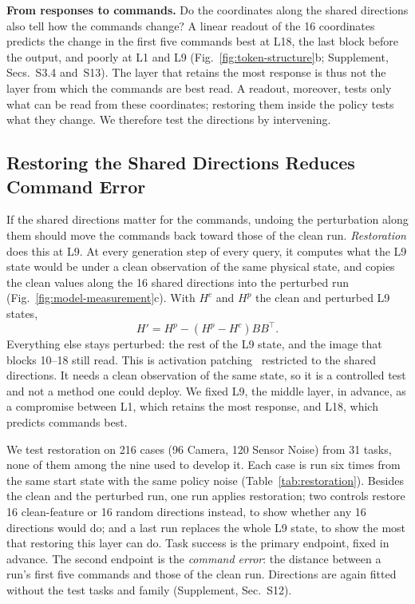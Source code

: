 

\textbf{From responses to commands.}\label{sec:layers} Do the coordinates along the shared directions also tell how the commands change? A linear readout of the 16 coordinates predicts the change in the first five commands best at L18, the last block before the output, and poorly at L1 and L9 (Fig.~\ref{fig:token-structure}b; Supplement, Secs.~S3.4 and~S13). The layer that retains the most response is thus not the layer from which the commands are best read. A readout, moreover, tests only what can be read from these coordinates; restoring them inside the policy tests what they change. We therefore test the directions by intervening.

\subsection{Restoring the Shared Directions Reduces Command Error}
\label{sec:restoration}
If the shared directions matter for the commands, undoing the perturbation along them should move the commands back toward those of the clean run. \emph{Restoration} does this at L9. At every generation step of every query, it computes what the L9 state would be under a clean observation of the same physical state, and copies the clean values along the 16 shared directions into the perturbed run (Fig.~\ref{fig:model-measurement}c). With $H^c$ and $H^p$ the clean and perturbed L9 states,
\begin{equation}
H'=H^p-(H^p-H^c)BB^\top.
\label{eq:coordinate-restoration}
\end{equation}
Everything else stays perturbed: the rest of the L9 state, and the image that blocks 10--18 still read. This is activation patching~\cite{meng2022locating} restricted to the shared directions. It needs a clean observation of the same state, so it is a controlled test and not a method one could deploy. We fixed L9, the middle layer, in advance, as a compromise between L1, which retains the most response, and L18, which predicts commands best.



We test restoration on 216 cases (96 Camera, 120 Sensor Noise) from 31 tasks, none of them among the nine used to develop it. Each case is run six times from the same start state with the same policy noise (Table~\ref{tab:restoration}). Besides the clean and the perturbed run, one run applies restoration; two controls restore 16 clean-feature or 16 random directions instead, to show whether any 16 directions would do; and a last run replaces the whole L9 state, to show the most that restoring this layer can do. Task success is the primary endpoint, fixed in advance. The second endpoint is the \emph{command error}: the distance between a run's first five commands and those of the clean run. Directions are again fitted without the test tasks and family (Supplement, Sec.~S12).

